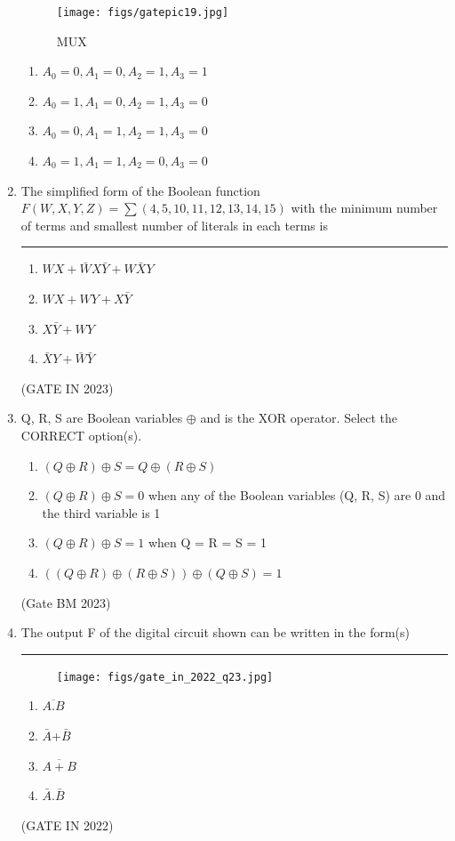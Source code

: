 \begin{enumerate}
	 \begin{figure}[h]
		 \centering
		\texttt{[image: figs/gatepic19.jpg]}
		\caption{MUX}
		 \label{fig:MUX}
	\end{figure}
	 \begin{enumerate}[label=(\Alph*)]
		\item $A_0=0,A_1=0,A_2=1,A_3=1$
		\item $A_0=1,A_1=0,A_2=1,A_3=0$
		\item $A_0=0,A_1=1,A_2=1,A_3=0$
		\item $A_0=1,A_1=1,A_2=0,A_3=0$
	\end{enumerate}

 \item The simplified form of the Boolean function $F(W,X,Y,Z)=\sum(4,5,10,11,12,13,14,15)$ with the minimum number of terms and smallest number of literals in each terms is \rule{60pt}{1pt}
	  \begin{enumerate}
		  \item $WX+\bar WX\bar Y+W\bar XY$
		   \item $WX+WY+X\bar Y$
		     \item $X\bar Y+WY$
		      \item$\bar XY+\bar W\bar Y$
	\end{enumerate}
 \hfill{(GATE IN 2023)}

\item Q, R, S are Boolean variables  $ \oplus$ and is the XOR operator. Select the CORRECT option(s).

\begin{enumerate}
\item $(Q  \oplus  R)  \oplus  S = Q  \oplus  (R  \oplus  S) $
\item $(Q  \oplus  R)  \oplus  S = 0$ when any of the Boolean variables (Q, R, S) are 0 and the third variable is 1
\item $(Q  \oplus  R)  \oplus  S = 1$ when Q = R = S = 1
\item $((Q  \oplus  R)  \oplus  (R  \oplus  S))  \oplus  (Q  \oplus  S) = 1$
\end{enumerate}
\hfill{(Gate BM 2023)}

\item The output F of the digital circuit shown can be written in the form(s)\rule{2cm}{0.5pt}
    \begin{figure}[h]
        \centering
        \texttt{[image: figs/gate\_in\_2022\_q23.jpg]}
        \caption{}
    \end{figure}
    \begin{enumerate}
        \item $\overline{A.B}$
        \item $\bar{A}$+$\bar{B}$
        \item $\overline{A + B}$
        \item $\bar{A}$.$\bar{B}$
    \end{enumerate}
    \hfill (GATE IN 2022)


\end{enumerate}
